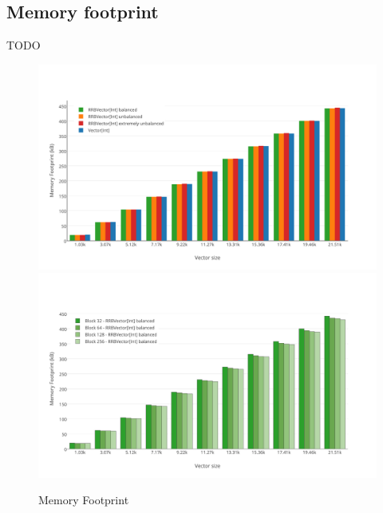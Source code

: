 \subsection{Memory footprint}
\color{red} TODO \color{black}

\begin{figure}[h!]
  \centering
  \includegraphics[width=\textwidth]{Benchmarks/Memory_3.pdf}
  \includegraphics[width=\textwidth]{Benchmarks/Memory_blocks.pdf}
  \label{MemoryFootprints}
  \caption{Memory Footprint}
\end{figure}



